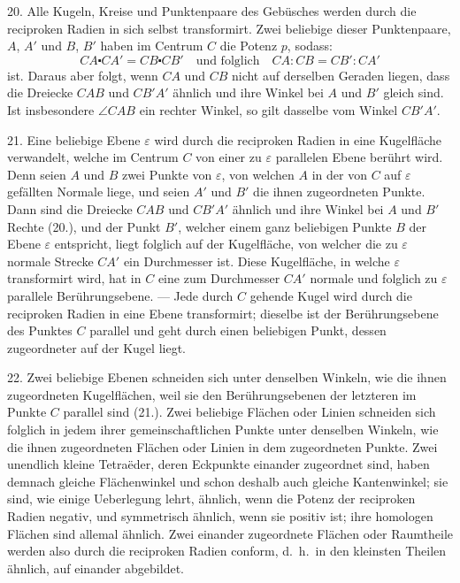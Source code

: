 20. Alle Kugeln, Kreise und Punktenpaare des Geb\"usches
werden durch die reciproken Radien in sich selbst transformirt.
Zwei beliebige dieser Punktenpaare, $A$, $A'$ und $B$, $B'$
haben im Centrum $C$ die Potenz $p$, sodass:
\[
CA \centerdot CA' = CB \centerdot CB' \quad \text{und folglich} \quad CA : CB = CB' : CA'
\]
ist. Daraus aber folgt, wenn $CA$ und $CB$ nicht auf derselben
Geraden liegen, dass die Dreiecke $CAB$ und $CB'A'$
\"ahnlich und ihre Winkel bei $A$ und $B'$ gleich sind. Ist insbesondere
$\angle CAB$ ein rechter Winkel, so gilt dasselbe vom
Winkel $CB'A'$.

21. Eine beliebige Ebene $\varepsilon$ wird durch die reciproken
Radien in eine Kugelfl\"ache verwandelt, welche im Centrum
$C$ von einer zu $\varepsilon$ parallelen Ebene ber\"uhrt wird. Denn
seien $A$ und $B$ zwei Punkte von $\varepsilon$, von welchen $A$ in der
von $C$ auf $\varepsilon$ gef\"allten Normale liege, und seien $A'$ und $B'$
die ihnen zugeordneten Punkte. Dann sind die Dreiecke
$CAB$ und $CB'A'$ \"ahnlich und ihre Winkel bei $A$ und $B'$
Rechte (20.), und der Punkt $B'$, welcher einem ganz beliebigen
Punkte $B$ der Ebene $\varepsilon$ entspricht, liegt folglich auf
der Kugelfl\"ache, von welcher die zu $\varepsilon$ normale Strecke $CA'$
ein Durchmesser ist. Diese Kugelfl\"ache, in welche $\varepsilon$ transformirt
wird, hat in $C$ eine zum Durchmesser $CA'$ normale
und folglich zu $\varepsilon$ parallele Ber\"uhrungsebene. --- Jede durch
$C$ gehende Kugel wird durch die reciproken Radien in eine
Ebene transformirt; dieselbe ist der Ber\"uhrungsebene des
Punktes $C$ parallel und geht durch einen beliebigen Punkt,
dessen zugeordneter auf der Kugel liegt.

22. Zwei beliebige Ebenen schneiden sich unter denselben
Winkeln, wie die ihnen zugeordneten Kugelfl\"achen,
weil sie den Ber\"uhrungsebenen der letzteren im Punkte $C$
parallel sind (21.). Zwei beliebige Fl\"achen oder Linien
schneiden sich folglich in jedem ihrer gemeinschaftlichen
Punkte unter denselben Winkeln, wie die ihnen zugeordneten
Fl\"achen oder Linien in dem zugeordneten Punkte. Zwei unendlich
kleine Tetra\"eder, deren Eckpunkte einander zugeordnet
sind, haben demnach gleiche Fl\"achenwinkel und schon
deshalb auch gleiche Kantenwinkel; sie sind, wie einige
Ueberlegung lehrt, \"ahnlich, wenn die Potenz der reciproken
Radien negativ, und symmetrisch \"ahnlich, wenn sie positiv
ist; ihre homologen Fl\"achen sind allemal \"ahnlich. Zwei
einander zugeordnete Fl\"achen oder Raumtheile werden also
durch die reciproken Radien {\glqq}conform{\grqq}, d.~h.\ in den kleinsten
Theilen \"ahnlich, auf einander abgebildet.

